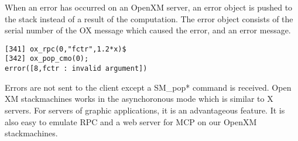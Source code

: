 When an error has occurred on an OpenXM server,
an error object is pushed to the stack instead of a result of the computation.
The error object consists of the serial number of the OX message
which caused the error, and an error message.
\begin{verbatim}
[341] ox_rpc(0,"fctr",1.2*x)$
[342] ox_pop_cmo(0);
error([8,fctr : invalid argument])
\end{verbatim}

Errors are not sent to the client except a SM\_pop* command is received.
Open XM stackmachines works in the asynchoronous mode which is similar 
to X servers.
For servers of graphic applications, it is an advantageous feature.
It is also easy to emulate RPC and a web server for MCP \cite{iamc} 
on our OpenXM stackmachines.





